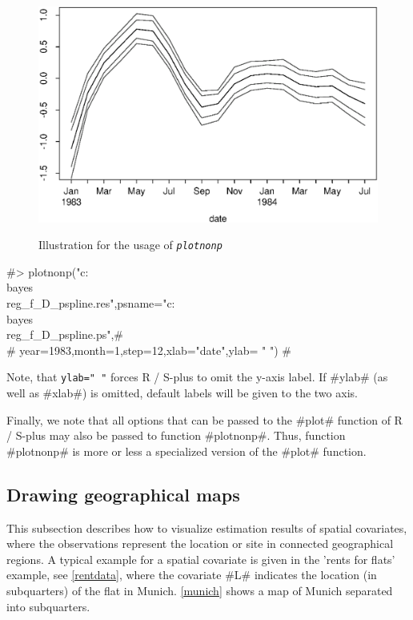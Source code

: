 \begin{figure}[ht]
\begin{center}
\includegraphics[scale=0.8]{grafiken/plotnonpdate.eps}
{\em\caption{ \label{illgraph2} Illustration for the usage of
\em\tt plotnonp}}
\end{center}
\end{figure}

#> plotnonp("c:\\bayes\\reg_f_D_pspline.res",psname="c:\\bayes\\reg_f_D_pspline.ps",#\\
#  year=1983,month=1,step=12,xlab="date",ylab= " ") #

Note, that \texttt{ylab=" "} forces R / S-plus to omit the y-axis
label. If #ylab# (as well as #xlab#) is omitted, default labels will
be given to the two axis.

Finally, we note that all options that can be passed to the #plot#
function of R / S-plus may also be passed to function #plotnonp#.
Thus, function #plotnonp# is more or less a specialized version of
the #plot# function.


\subsection{Drawing geographical maps}  

This subsection describes how to visualize estimation results of
spatial covariates, where the observations represent the location
or site in connected geographical regions. A typical example for a
spatial covariate is given in the 'rents for flats' example, see
\autoref{rentdata}, where the covariate #L# indicates the location
(in subquarters) of the flat in Munich. \autoref{munich} shows a
map of Munich separated into subquarters.

